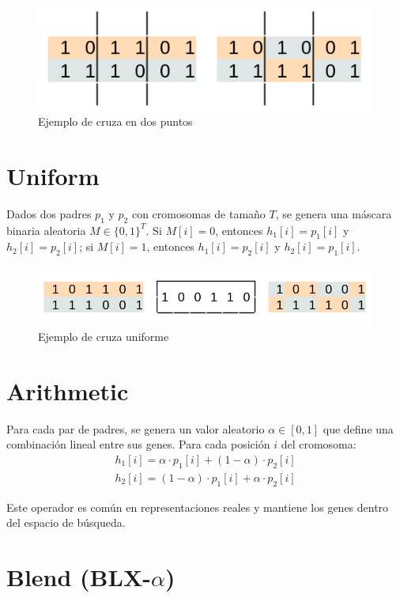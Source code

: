 \begin{figure}[H]
	\centering
	\includegraphics[width=0.75\linewidth]{img/cross_two.png}
	\caption{Ejemplo de cruza en dos puntos}
	\label{fig:cross_two}
\end{figure}

\section{Uniform}

Dados dos padres $p_1$ y $p_2$ con cromosomas de tamaño $T$, se genera una máscara binaria aleatoria $M \in \{0, 1\}^T$. Si $M[i] = 0$, entonces $h_1[i] = p_1[i]$ y $h_2[i] = p_2[i]$; si $M[i] = 1$, entonces $h_1[i] = p_2[i]$ y $h_2[i] = p_1[i]$.

\begin{figure}[H]
	\centering
	\includegraphics[width=0.75\linewidth]{img/cross_uniform.png}
	\caption{Ejemplo de cruza uniforme}
	\label{fig:cross_uniform}
\end{figure}

\section{Arithmetic}

Para cada par de padres, se genera un valor aleatorio $\alpha \in [0, 1]$ que define una combinación lineal entre sus genes. Para cada posición $i$ del cromosoma:
\begin{gather*}
	h_1[i] = \alpha \cdot p_1[i] + (1 - \alpha) \cdot p_2[i] \\
	h_2[i] = (1 - \alpha) \cdot p_1[i] + \alpha \cdot p_2[i]
\end{gather*}

Este operador es común en representaciones reales y mantiene los genes dentro del espacio de búsqueda.

\section{Blend (BLX-$\alpha$)}

